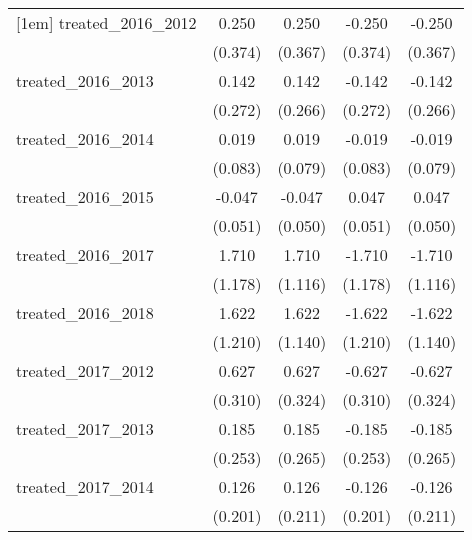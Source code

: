 {\begin{tabular}{l*{4}{c}}
[1em]
treated\_2016\_2012&       0.250         &       0.250         &      -0.250         &      -0.250         \\
            &     (0.374)         &     (0.367)         &     (0.374)         &     (0.367)         \\
[1em]
treated\_2016\_2013&       0.142         &       0.142         &      -0.142         &      -0.142         \\
            &     (0.272)         &     (0.266)         &     (0.272)         &     (0.266)         \\
[1em]
treated\_2016\_2014&       0.019         &       0.019         &      -0.019         &      -0.019         \\
            &     (0.083)         &     (0.079)         &     (0.083)         &     (0.079)         \\
[1em]
treated\_2016\_2015&      -0.047         &      -0.047         &       0.047         &       0.047         \\
            &     (0.051)         &     (0.050)         &     (0.051)         &     (0.050)         \\
[1em]
treated\_2016\_2017&       1.710         &       1.710         &      -1.710         &      -1.710         \\
            &     (1.178)         &     (1.116)         &     (1.178)         &     (1.116)         \\
[1em]
treated\_2016\_2018&       1.622         &       1.622         &      -1.622         &      -1.622         \\
            &     (1.210)         &     (1.140)         &     (1.210)         &     (1.140)         \\
[1em]
treated\_2017\_2012&       0.627\sym{*}  &       0.627         &      -0.627\sym{*}  &      -0.627         \\
            &     (0.310)         &     (0.324)         &     (0.310)         &     (0.324)         \\
[1em]
treated\_2017\_2013&       0.185         &       0.185         &      -0.185         &      -0.185         \\
            &     (0.253)         &     (0.265)         &     (0.253)         &     (0.265)         \\
[1em]
treated\_2017\_2014&       0.126         &       0.126         &      -0.126         &      -0.126         \\
            &     (0.201)         &     (0.211)         &     (0.201)         &     (0.211)         \\

\end{tabular}}
